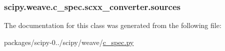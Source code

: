 \subsubsection[{sources}]{\setlength{\rightskip}{0pt plus 5cm}scipy.\+weave.\+c\+\_\+spec.\+scxx\+\_\+converter.\+sources}\label{classscipy_1_1weave_1_1c__spec_1_1scxx__converter_a964030b67b71acb78c2f221826778104}


The documentation for this class was generated from the following file\+:\begin{DoxyCompactItemize}
\item 
packages/scipy-\/0../scipy/weave/\hyperlink{c__spec_8py}{c\+\_\+spec.\+py}\end{DoxyCompactItemize}
